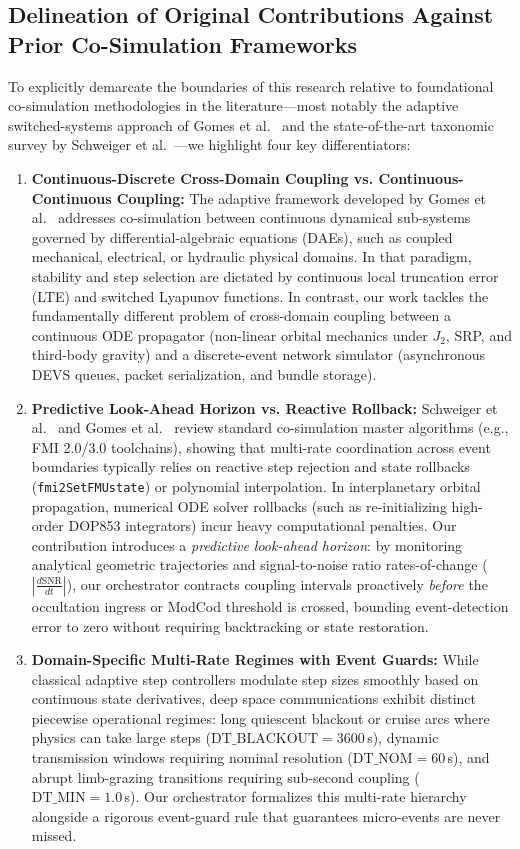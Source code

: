 \documentclass[a4paper,fleqn]{cas-sc}
\begin{document}
\subsection{Delineation of Original Contributions Against Prior Co-Simulation Frameworks}
To explicitly demarcate the boundaries of this research relative to foundational co-simulation methodologies in the literature---most notably the adaptive switched-systems approach of Gomes et al.~\cite{simpat_adaptive} and the state-of-the-art taxonomic survey by Schweiger et al.~\cite{simpat_multirate}---we highlight four key differentiators:
\begin{enumerate}
    \item \textbf{Continuous-Discrete Cross-Domain Coupling vs. Continuous-Continuous Coupling:} The adaptive framework developed by Gomes et al.~\cite{simpat_adaptive} addresses co-simulation between continuous dynamical sub-systems governed by differential-algebraic equations (DAEs), such as coupled mechanical, electrical, or hydraulic physical domains. In that paradigm, stability and step selection are dictated by continuous local truncation error (LTE) and switched Lyapunov functions. In contrast, our work tackles the fundamentally different problem of cross-domain coupling between a continuous ODE propagator (non-linear orbital mechanics under $J_2$, SRP, and third-body gravity) and a discrete-event network simulator (asynchronous DEVS queues, packet serialization, and bundle storage). 
    \item \textbf{Predictive Look-Ahead Horizon vs. Reactive Rollback:} Schweiger et al.~\cite{simpat_multirate} and Gomes et al.~\cite{gomes_cosim_survey_2018} review standard co-simulation master algorithms (e.g., FMI 2.0/3.0 toolchains), showing that multi-rate coordination across event boundaries typically relies on reactive step rejection and state rollbacks (\texttt{fmi2SetFMUstate}) or polynomial interpolation. In interplanetary orbital propagation, numerical ODE solver rollbacks (such as re-initializing high-order DOP853 integrators) incur heavy computational penalties. Our contribution introduces a \textit{predictive look-ahead horizon}: by monitoring analytical geometric trajectories and signal-to-noise ratio rates-of-change ($\left|\frac{d\text{SNR}}{dt}\right|$), our orchestrator contracts coupling intervals proactively \textit{before} the occultation ingress or ModCod threshold is crossed, bounding event-detection error to zero without requiring backtracking or state restoration.
    \item \textbf{Domain-Specific Multi-Rate Regimes with Event Guards:} While classical adaptive step controllers modulate step sizes smoothly based on continuous state derivatives, deep space communications exhibit distinct piecewise operational regimes: long quiescent blackout or cruise arcs where physics can take large steps ($\text{DT\_BLACKOUT} = 3600\,$s), dynamic transmission windows requiring nominal resolution ($\text{DT\_NOM} = 60\,$s), and abrupt limb-grazing transitions requiring sub-second coupling ($\text{DT\_MIN} = 1.0\,$s). Our orchestrator formalizes this multi-rate hierarchy alongside a rigorous event-guard rule that guarantees micro-events are never missed.

\end{enumerate}
\end{document}
